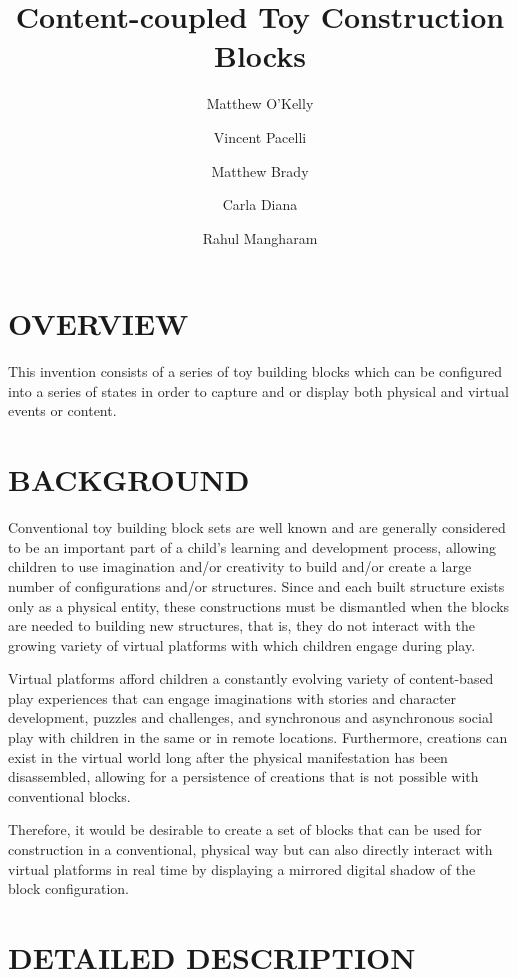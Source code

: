 \documentclass[]{article}
\title{Content-coupled Toy Construction Blocks}
\author{Matthew O'Kelly \and Vincent Pacelli \and Matthew Brady \and Carla Diana \and Rahul Mangharam}
\begin{document}
\maketitle

\section{OVERVIEW}
This invention consists of a series of toy building blocks which can be configured into a series of states in order to capture and or display both physical and virtual events or content. 

\section{BACKGROUND}
Conventional toy building block sets are well known and are generally considered to be an important part of a child's learning and development process, allowing children to use imagination and/or creativity to build and/or create a large number of configurations and/or structures. Since and each built structure exists only as a physical entity, these constructions must be dismantled when the blocks are needed to building new structures, that is, they do not interact with the growing variety of virtual platforms with which children engage during play.

Virtual platforms afford children a constantly evolving variety of content-based play experiences that can engage imaginations with stories and character development, puzzles and challenges, and synchronous and asynchronous social play with children in the same or in remote locations. Furthermore, creations can exist in the virtual world long after the physical manifestation has been disassembled, allowing for a persistence of creations that is not possible with conventional blocks.

Therefore, it would be desirable to create a set of blocks that can be used for construction in a conventional, physical way but can also directly interact with virtual platforms in real time by displaying a mirrored digital shadow of the block configuration.

\section{DETAILED DESCRIPTION}
\end{document}
